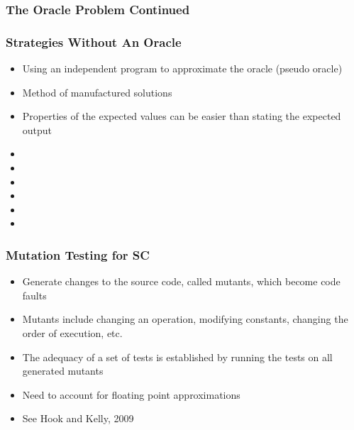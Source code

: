 \documentclass[t,12pt,numbers,fleqn]{beamer}
\begin{document}
\begin{frame}
\frametitle{The Oracle Problem Continued}


\end{frame}


\begin{frame}
\frametitle{Strategies Without An Oracle}

\begin{itemize}

\item Using an independent program to approximate the oracle (pseudo oracle)
\item Method of manufactured solutions
\item Properties of the expected values can be easier than stating the expected
  output
\bi
\item {}
\item {}
\item {}
\item {}
\item {}
\item {}
\ei
\end{itemize}

\end{frame}


\begin{frame}
\frametitle{Mutation Testing for SC}
\begin{itemize}
\item Generate changes to the source code, called mutants, which become code faults
\item Mutants include changing an operation, modifying constants, changing the order of execution, etc.
\item The adequacy of a set of tests is established by running the tests on all generated mutants
\item Need to account for floating point approximations
\item See Hook and Kelly, 2009
\end{itemize}
\end{frame}
\end{document}
